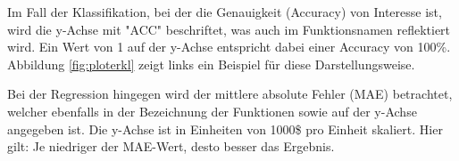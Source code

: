 Im Fall der Klassifikation, bei der die Genauigkeit (Accuracy) von Interesse ist, wird die y-Achse mit "ACC" beschriftet, was auch im 
Funktionsnamen reflektiert wird. Ein Wert von 1 auf der y-Achse entspricht dabei einer Accuracy von 100\%. Abbildung 
\ref{fig:ploterkl} zeigt links ein Beispiel für diese Darstellungsweise.

Bei der Regression hingegen wird der mittlere absolute Fehler (MAE) betrachtet, welcher ebenfalls in der Bezeichnung der Funktionen sowie auf 
der y-Achse angegeben ist. Die y-Achse ist in Einheiten von 1000\$ pro Einheit skaliert. Hier gilt: Je niedriger der MAE-Wert, 
desto besser das Ergebnis.
